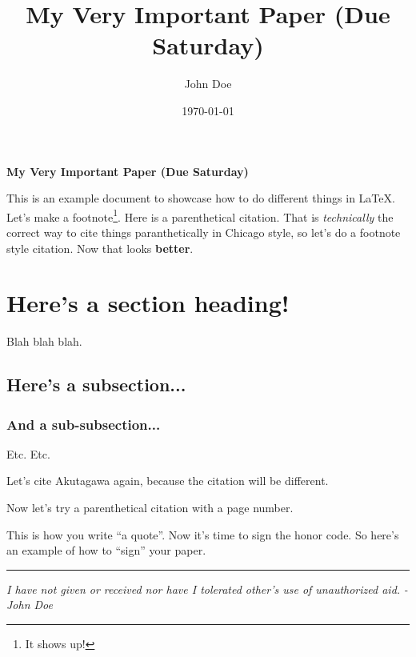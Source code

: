 \documentclass[letterpaper]{turabian-researchpaper}
\title{My Very Important Paper (Due Saturday)}
\subtitle{}
\author{John Doe}
\date{\today}
\begin{document}
\maketitle
\doublespacing

\begin{center}
	\textbf{My Very Important Paper (Due Saturday)}
\end{center}


This is an example document to showcase how to do different things in \LaTeX.
Let's make a footnote\footnote{It shows up!}. Here is a parenthetical citation\parencite{kant}.
That is \textit{technically} the correct way to cite things paranthetically in Chicago style, so let's
do a footnote style citation\autocite{akut, 34}. Now that looks \textbf{better}.

\section{Here's a section heading!}


Blah blah blah.

\subsection{Here's a subsection...}
\subsubsection{And a sub-subsection...}

Etc. Etc.

Let's cite Akutagawa again\autocite{akut}, because the citation will be different.

Now let's try a parenthetical citation with a page number\parencite{mill, 54}.

This is how you write ``a quote''\parencite*{akut, 84}.
Now it's time to sign the honor code. So here's an example of
how to ``sign'' your paper.

\noindent\rule{\textwidth}{1pt} %
\begin{center}
	\textit{I have not given or received nor have I tolerated other's use of unauthorized aid.}
	\newline
	\textit{- John Doe}
\end{center}

\newpage
\printbibliography
\end{document}
